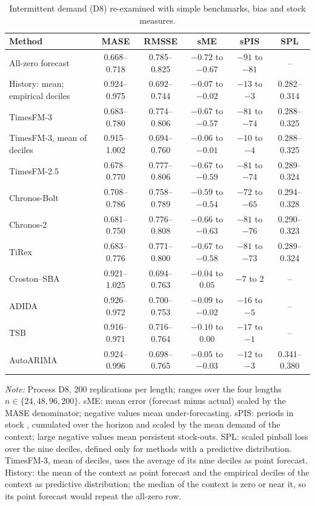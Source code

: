 \begin{table}[!htbp]
\centering
\begin{threeparttable}
\caption{Intermittent demand (D8) re-examined with simple benchmarks, bias and stock measures.}
\label{tab:d8ext}
\small\setlength{\tabcolsep}{4pt}
\begin{tabular}{lccccc}
\toprule
Method & MASE & RMSSE & sME & sPIS & SPL \\
\midrule
All-zero forecast & 0.668--0.718 & 0.785--0.825 & $-0.72$ to $-0.67$ & $-91$ to $-81$ & -- \\
History: mean; empirical deciles & 0.924--0.975 & 0.692--0.744 & $-0.07$ to $-0.02$ & $-13$ to $-3$ & 0.282--0.314 \\
TimesFM-3 & 0.683--0.780 & 0.774--0.806 & $-0.67$ to $-0.57$ & $-81$ to $-74$ & 0.288--0.325 \\
TimesFM-3, mean of deciles & 0.915--1.002 & 0.694--0.760 & $-0.06$ to $-0.01$ & $-10$ to $-4$ & 0.288--0.325 \\
TimesFM-2.5 & 0.678--0.770 & 0.777--0.806 & $-0.67$ to $-0.59$ & $-81$ to $-74$ & 0.289--0.324 \\
Chronos-Bolt & 0.708--0.786 & 0.758--0.789 & $-0.59$ to $-0.54$ & $-72$ to $-65$ & 0.294--0.328 \\
Chronos-2 & 0.681--0.750 & 0.776--0.808 & $-0.66$ to $-0.63$ & $-81$ to $-76$ & 0.290--0.323 \\
TiRex & 0.683--0.776 & 0.771--0.800 & $-0.67$ to $-0.58$ & $-81$ to $-73$ & 0.289--0.324 \\
Croston--SBA & 0.921--1.025 & 0.694--0.763 & $-0.04$ to $0.05$ & $-7$ to $2$ & -- \\
ADIDA & 0.926--0.972 & 0.700--0.753 & $-0.09$ to $-0.02$ & $-16$ to $-5$ & -- \\
TSB & 0.916--0.971 & 0.716--0.764 & $-0.10$ to $0.00$ & $-17$ to $-1$ & -- \\
AutoARIMA & 0.924--0.996 & 0.698--0.765 & $-0.05$ to $-0.03$ & $-12$ to $-3$ & 0.341--0.380 \\
\bottomrule
\end{tabular}
\begin{tablenotes}[flushleft]\footnotesize
\item \textit{Note:} Process D8, 200 replications per length; ranges over the four lengths $n \in \{24, 48, 96, 200\}$. sME: mean error (forecast minus actual) scaled by the MASE denominator; negative values mean under-forecasting. sPIS: periods in stock \citep{wallstrom2010pis}, cumulated over the horizon and scaled by the mean demand of the context; large negative values mean persistent stock-outs. SPL: scaled pinball loss over the nine deciles, defined only for methods with a predictive distribution. TimesFM-3, mean of deciles, uses the average of its nine deciles as point forecast. History: the mean of the context as point forecast and the empirical deciles of the context as predictive distribution; the median of the context is zero or near it, so its point forecast would repeat the all-zero row.
\end{tablenotes}
\end{threeparttable}
\end{table}
